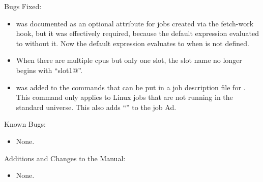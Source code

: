 \noindent Bugs Fixed:

\begin{itemize}

\item {} was documented as an optional attribute for
  jobs created via the fetch-work hook, but it was effectively
  required, because the default 
  expression evaluated to  without it.  Now the
  default  expression evaluates to
   when  is not defined.

\item When there are multiple cpus but only one slot, the slot name no
longer begins with ``slot1@''.

\item {} was added to the commands that can be put in
  a job description file for . This command only applies to
  Linux jobs that are not running in the standard universe. This also
  adds ``'' to the job Ad.

\end{itemize}

\noindent Known Bugs:

\begin{itemize}

\item None.

\end{itemize}

\noindent Additions and Changes to the Manual:

\begin{itemize}

\item None.

\end{itemize}

